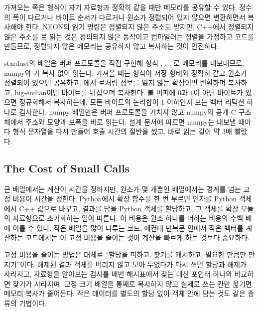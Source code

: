 가져오는 쪽은 형식이 자기 자료형과 정확히 같을 때만 메모리를 공유할 수 있다. 정수의 폭이 다르거나 바이트 순서가 다르거나 원소가 정렬되어 있지 않으면 변환하면서 복사해야 한다. NEON의 읽기 명령은 정렬되지 않은 주소도 받지만, C++에서 정렬되지 않은 주소를 로 읽는 것은 정의되지 않은 동작이고 컴파일러는 정렬을 가정하고 코드를 만들므로, 정렬되지 않은 메모리는 공유하지 않고 복사하는 것이 안전하다.

\begin{instardust}
stardust의 배열은 버퍼 프로토콜을 직접 구현해 형식 , , , 로 메모리를 내보내므로, numpy와 가 복사 없이 읽는다. 가져올 때는 형식이 저장 형태와 정확히 같고 원소가 정렬되어 있으면 공유하고, 에서 로처럼 정보를 잃지 않는 확장이면 변환하며 복사하고, big-endian이면 바이트를 뒤집으며 복사한다. 불 버퍼에 $0$과 $1$이 아닌 바이트가 있으면 정규화해서 복사하는데, 모든 바이트의 논리합이 $1$ 이하인지 보는 벡터 리덕션 하나로 검사한다. numpy 배열만은 버퍼 프로토콜을 거치지 않고 numpy의 공개 C 구조체에서 주소와 모양과 보폭을 바로 읽는다. 설계 문서에 따르면 numpy는 내보낼 때마다 형식 문자열을 다시 만들어 호출 시간의 절반을 썼고, 바로 읽는 길이 약 $3$배 빨랐다.
\end{instardust}

\subsection{The Cost of Small Calls}

큰 배열에서는 계산이 시간을 정하지만, 원소가 몇 개뿐인 배열에서는 경계를 넘는 고정 비용이 시간을 정한다. Python에서 확장 함수를 한 번 부르면 인자를 Python 객체에서 C++ 값으로 바꾸고, 결과를 담을 Python 객체를 할당하고, 그 객체를 확장 모듈의 자료형으로 초기화하는 일이 따른다. 이 비용은 원소 하나를 더하는 비용의 수백 배에 이를 수 있다. 작은 배열을 많이 다루는 코드, 예컨대 반복문 안에서 작은 벡터를 계산하는 코드에서는 이 고정 비용을 줄이는 것이 계산을 빠르게 하는 것보다 중요하다.

고정 비용을 줄이는 방법은 대체로 ``할당을 피하고, 찾기를 캐시하고, 필요한 만큼만 만지기''이다. 해제된 결과 객체를 버리지 않고 모아 두었다가 다시 쓰면 할당과 해제가 사라지고, 자료형을 알아보는 검사를 매번 해시표에서 찾는 대신 포인터 하나와 비교하면 찾기가 사라지며, 고정 크기 배열을 통째로 복사하지 않고 실제로 쓰는 칸만 옮기면 메모리 복사가 줄어든다. 작은 데이터를 별도의 할당 없이 객체 안에 담는 것도 같은 종류의 기법이다.

